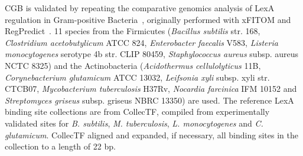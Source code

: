 \documentclass[12pt]{article}
\begin{document}
CGB is validated by repeating the comparative genomics analysis of LexA
regulation in Gram-positive Bacteria~\cite{cornish2012inference}, originally
performed with xFITOM and RegPredict~\cite{bhargava2010xfitom,
  novichkov2010regpredict}. 11 species from the Firmicutes (\textit{Bacillus
  subtilis} str. 168, \textit{Clostridium acetobutylicum} ATCC 824,
\textit{Enterobacter faecalis} V583, \textit{Listeria monocytogenes} serotype
4b str. CLIP 80459, \textit{Staphylococcus aureus} subsp. aureus NCTC 8325) and
the Actinobacteria (\textit{Acidothermus cellulolyticus} 11B,
\textit{Corynebacterium glutamicum} ATCC 13032, \textit{Leifsonia xyli}
subsp. xyli str. CTCB07, \textit{Mycobacterium tuberculosis} H37Rv,
\textit{Nocardia farcinica} IFM 10152 and \textit{Streptomyces griseus}
subsp. griseus NBRC 13350) are used. The reference LexA binding site
collections are from CollecTF, compiled from experimentally validated sites for
\textit{B. subtilis}, \textit{M. tuberculosis}, \textit{L. monocytogenes} and
\textit{C. glutamicum}. CollecTF aligned and expanded, if necessary, all
binding sites in the collection to a length of 22 bp.
\end{document}
